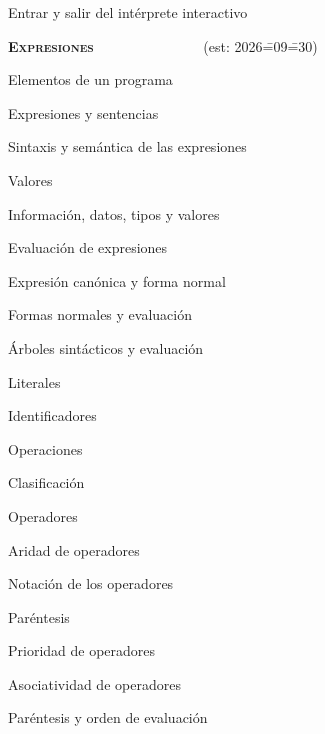 \begin{longenum}
\begin{longenum}
\begin{longenum}
            \begin{longenum}
                \item Entrar y salir del intérprete interactivo
            \end{longenum}
        \end{longenum}
    \end{longenum}
    \item \textbf{\textsc{Expresiones}} \ \ \ \ \ \ \ \ \ \ \ \ \ \ \ (est: 2026\==09\==30)
    \begin{longenum}
        \item Elementos de un programa
        \begin{longenum}
            \item Expresiones y sentencias
            \item Sintaxis y semántica de las expresiones
        \end{longenum}
        \item Valores
        \begin{longenum}
            \item Información, datos, tipos y valores
            \item Evaluación de expresiones
            \item Expresión canónica y forma normal
            \item Formas normales y evaluación
            \item Árboles sintácticos y evaluación
            \item Literales
            \item Identificadores
        \end{longenum}
        \item Operaciones
        \begin{longenum}
            \item Clasificación
            \item Operadores
            \begin{longenum}
                \item Aridad de operadores
                \item Notación de los operadores
                \item Paréntesis
                \item Prioridad de operadores
                \item Asociatividad de operadores
                \item Paréntesis y orden de evaluación

\end{longenum}
\end{longenum}
\end{longenum}
\end{longenum}
